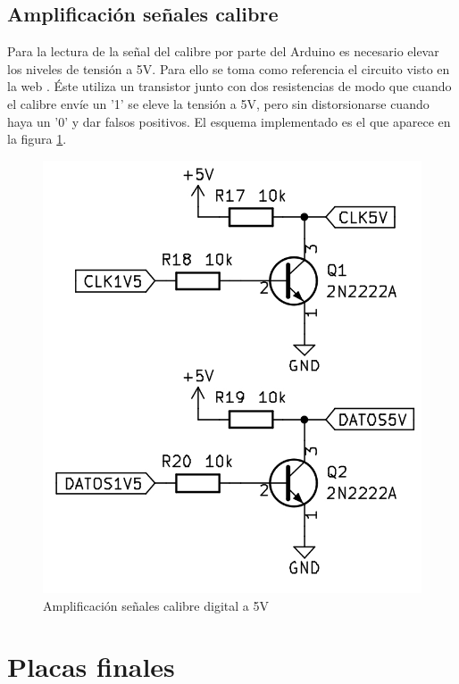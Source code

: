 \subsection{Amplificación señales calibre}

Para la lectura de la señal del calibre por parte del Arduino es necesario elevar los niveles de tensión a 5V.
Para ello se toma como referencia el circuito visto en la web \cite{caliper}. Éste utiliza un transistor junto
con dos resistencias de modo que cuando el calibre envíe un '1' se eleve la tensión a 5V, pero sin distorsionarse
cuando haya un '0' y dar falsos positivos. El esquema implementado es el que aparece en la figura \ref{fig:figura36amp}.

\begin{figure}[hbtp]
    \centering
    \includegraphics[width=\textwidth/2]{03-placa/05-amplificacion-calibre.png}
    \caption{Amplificación señales calibre digital a 5V}
    \label{fig:figura36amp}
    \end{figure}

\section{Placas finales}

